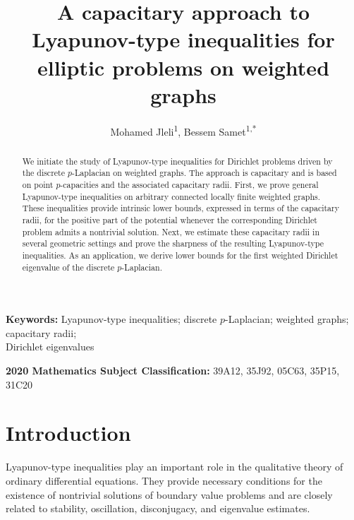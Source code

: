 \documentclass[twoside,12pt,letter]{article}
\title{A capacitary approach to Lyapunov-type inequalities for elliptic problems on weighted graphs}
\author{Mohamed Jleli\textsuperscript{1}, Bessem Samet\textsuperscript{1,*}}
\date{}
\theoremstyle{plain}
\theoremstyle{definition}
\theoremstyle{remark}
\numberwithin{equation}{section}
\begin{document}
\maketitle

\begingroup
\renewcommand{\thefootnote}{1}

\renewcommand{\thefootnote}{*}
\endgroup


\begin{abstract}
We initiate the study of Lyapunov-type inequalities for Dirichlet problems
driven by the discrete \(p\)-Laplacian on weighted graphs. The approach is
capacitary and is based on point \(p\)-capacities and the associated
capacitary radii. First, we prove general Lyapunov-type inequalities on
arbitrary connected locally finite weighted graphs. These inequalities provide
intrinsic lower bounds, expressed in terms of the capacitary radii, for the
positive part of the potential whenever the corresponding Dirichlet problem
admits a nontrivial solution. Next, we estimate these capacitary radii in
several geometric settings and prove the sharpness of the resulting
Lyapunov-type inequalities. As an application, we derive lower bounds for the
first weighted Dirichlet eigenvalue of the discrete \(p\)-Laplacian.
\end{abstract}
\begin{small} 
\noindent\textbf{Keywords:} Lyapunov-type inequalities; discrete
\(p\)-Laplacian; weighted graphs; capacitary radii;\\
Dirichlet eigenvalues

\medskip 

\noindent\textbf{2020 Mathematics Subject Classification:} 39A12, 35J92, 05C63, 35P15, 31C20  
\end{small}




\section{Introduction}

Lyapunov-type inequalities play an important role in the qualitative theory of
ordinary differential equations. They provide necessary conditions for the
existence of nontrivial solutions of boundary value problems and are closely
related to stability, oscillation, disconjugacy, and eigenvalue estimates.
\end{document}
